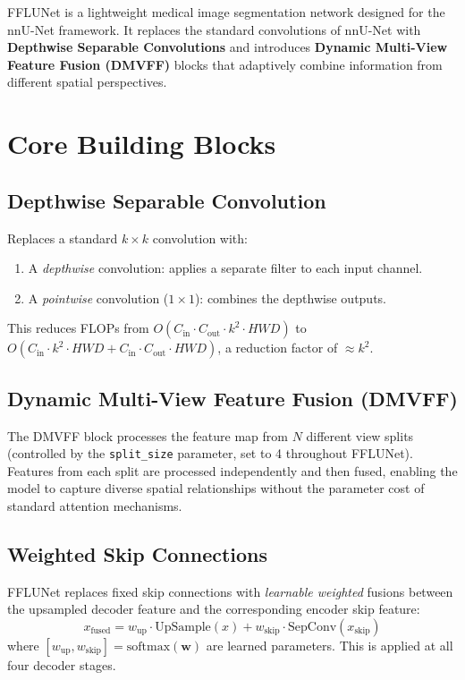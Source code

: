 \documentclass[12pt,a4paper]{report}
\begin{document}
FFLUNet \cite{duttafflunet} is a lightweight medical image segmentation network designed for the nnU-Net framework. It replaces the standard convolutions of nnU-Net with \textbf{Depthwise Separable Convolutions} and introduces \textbf{Dynamic Multi-View Feature Fusion (DMVFF)} blocks that adaptively combine information from different spatial perspectives.

\section{Core Building Blocks}

\subsection{Depthwise Separable Convolution}
Replaces a standard $k \times k$ convolution with:
\begin{enumerate}
    \item A \textit{depthwise} convolution: applies a separate filter to each input channel.
    \item A \textit{pointwise} convolution ($1 \times 1$): combines the depthwise outputs.
\end{enumerate}
This reduces FLOPs from $O(C_{\text{in}} \cdot C_{\text{out}} \cdot k^2 \cdot HWD)$ to $O(C_{\text{in}} \cdot k^2 \cdot HWD + C_{\text{in}} \cdot C_{\text{out}} \cdot HWD)$, a reduction factor of $\approx k^2$.

\subsection{Dynamic Multi-View Feature Fusion (DMVFF)}
The DMVFF block processes the feature map from $N$ different view splits (controlled by the \texttt{split\_size} parameter, set to 4 throughout FFLUNet). Features from each split are processed independently and then fused, enabling the model to capture diverse spatial relationships without the parameter cost of standard attention mechanisms.

\subsection{Weighted Skip Connections}
FFLUNet replaces fixed skip connections with \textit{learnable weighted} fusions between the upsampled decoder feature and the corresponding encoder skip feature:
\begin{equation}
x_{\text{fused}} = w_{\text{up}} \cdot \text{UpSample}(x) + w_{\text{skip}} \cdot \text{SepConv}(x_{\text{skip}})
\end{equation}
where $[w_{\text{up}}, w_{\text{skip}}] = \text{softmax}(\mathbf{w})$ are learned parameters. This is applied at all four decoder stages.
\end{document}
